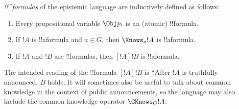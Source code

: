 \documentclass[../../../include/open-logic-section]{subfiles}
\begin{document}
\begin{defn}
\emph{!!^{formula}s} of the epistemic language are inductively
  defined as follows:
\begin{enumerate}


\item Every propositional variable $\Obj p_i$ is an (atomic) !!{formula}.






\item If $!A$ is !!a{formula} and $a \in G$, then $\Knows_a !A$ is
  !!a{formula}.
  
\item If $!A$ and $!B$ are !!{formula}s, then $[!A] !B$ is !!a{formula}.

\end{enumerate}
\end{defn}

The intended reading of the !!{formula} $[!A] !B$ is ``After $!A$ is truthfully announced,
$B$ holds. It will sometimes also be useful to talk about common knowledge in the context
of public announcements, so the language may also include the common knowledge
operator $\CKnows_G !A$.
\end{document}
